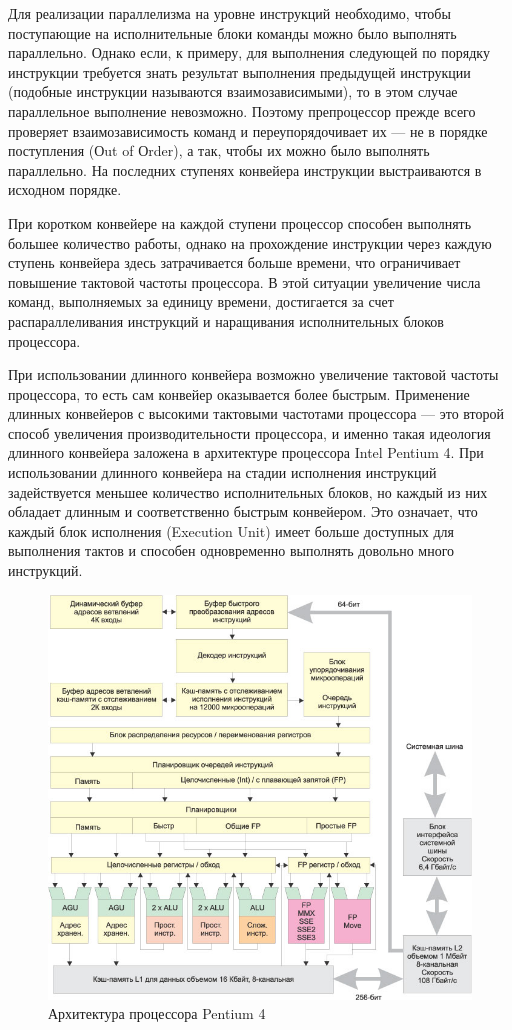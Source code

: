 \documentclass[12pt, a4paper, utf8]{article}
\begin{document}
Для реализации параллелизма на уровне инструкций необходимо, чтобы поступающие на исполнительные блоки команды можно было выполнять параллельно. Однако если, к примеру, для выполнения следующей по порядку инструкции требуется знать результат выполнения предыдущей инструкции (подобные инструкции называются взаимозависимыми), то в этом случае параллельное выполнение невозможно. Поэтому препроцессор прежде всего проверяет взаимозависимость команд и переупорядочивает их — не в порядке поступления (Оut of Оrder), а так, чтобы их можно было выполнять параллельно. На последних ступенях конвейера инструкции выстраиваются в исходном порядке.

При коротком конвейере на каждой ступени процессор способен выполнять большее количество работы, однако на прохождение инструкции через каждую ступень конвейера здесь затрачивается больше времени, что ограничивает повышение тактовой частоты процессора. В этой ситуации увеличение числа команд, выполняемых за единицу времени, достигается за счет распараллеливания инструкций и наращивания исполнительных блоков процессора.

При использовании длинного конвейера возможно увеличение тактовой частоты процессора, то есть сам конвейер оказывается более быстрым. Применение длинных конвейеров с высокими тактовыми частотами процессора — это второй способ увеличения производительности процессора, и именно такая идеология длинного конвейера заложена в архитектуре процессора Intel Pentium 4. При использовании длинного конвейера на стадии исполнения инструкций задействуется меньшее количество исполнительных блоков, но каждый из них обладает длинным и соответственно быстрым конвейером. Это означает, что каждый блок исполнения (Execution Unit) имеет больше доступных для выполнения тактов и способен одновременно выполнять довольно много инструкций.

\begin{figure}
\centering
\includegraphics[width=\textwidth]{imgs/ap4.jpg}
\caption{Архитектура процессора Pentium 4}\label{fig:arch_p4}
\end{figure}
\end{document}
